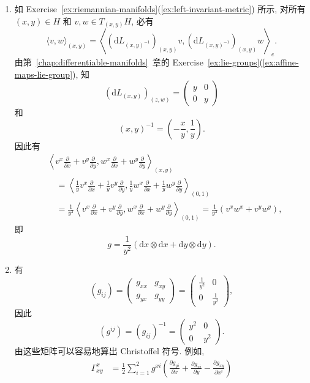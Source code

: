 \begin{description}[font=\normalfont,leftmargin=2em,labelwidth=1.5em]
\begin{enumerate}[label=(\alph*),ref=\alph*,leftmargin=*]
\item 如 Exercise~\ref{ex:riemannian-manifolds}(\ref{ex:left-invariant-metric}) 所示, 对所有 $(x,y)\in H$ 和 $v,w\in T_{(x,y)}H$, 必有
\[
  \langle v,w\rangle_{(x,y)}=
  \left\langle(\mathrm{d}L_{(x,y)^{-1}})_{(x,y)}v,(\mathrm{d}L_{(x,y)^{-1}})_{(x,y)}w\right\rangle_e.
\]
由第~\ref{chap:differentiable-manifolds}~章的 Exercise~\ref{ex:lie-groups}(\ref{ex:affine-maps-lie-group}), 知
\[
  (\mathrm{d}L_{(x,y)})_{(z,w)}=\begin{pmatrix}y&0\\0&y\end{pmatrix}
\]
和
\[
  (x,y)^{-1}=\left(-\frac{x}{y},\frac{1}{y}\right).
\]
因此有
\begin{align*}
  &\left\langle v^x\frac{\partial}{\partial x}+v^y\frac{\partial}{\partial y},
    w^x\frac{\partial}{\partial x}+w^y\frac{\partial}{\partial y}\right\rangle_{(x,y)}\\
  &\quad=\left\langle\frac1y v^x\frac{\partial}{\partial x}+\frac1y v^y\frac{\partial}{\partial y},
        \frac1y w^x\frac{\partial}{\partial x}+\frac1y w^y\frac{\partial}{\partial y}\right\rangle_{(0,1)}\\
  &\quad=\frac1{y^2}\left\langle v^x\frac{\partial}{\partial x}+v^y\frac{\partial}{\partial y},
    w^x\frac{\partial}{\partial x}+w^y\frac{\partial}{\partial y}\right\rangle_{(0,1)}
   =\frac1{y^2}(v^xw^x+v^yw^y),
\end{align*}
即
\[
  g=\frac1{y^2}(\mathrm{d}x\otimes\mathrm{d}x+\mathrm{d}y\otimes\mathrm{d}y).
\]
\item 有
\[
  (g_{ij})=\begin{pmatrix}g_{xx}&g_{xy}\\g_{yx}&g_{yy}\end{pmatrix}
  =\begin{pmatrix}\frac1{y^2}&0\\0&\frac1{y^2}\end{pmatrix},
\]
因此
\[
  (g^{ij})=(g_{ij})^{-1}=\begin{pmatrix}y^2&0\\0&y^2\end{pmatrix}.
\]
由这些矩阵可以容易地算出 Christoffel 符号. 例如,
\begin{align*}
  \Gamma^x_{xy}
  &=\frac12\sum_{i=1}^2g^{xi}
    \left(\frac{\partial g_{yi}}{\partial x}+\frac{\partial g_{xi}}{\partial y}
      -\frac{\partial g_{xy}}{\partial x^i}\right)\\

\end{align*}
\end{enumerate}
\end{description}
